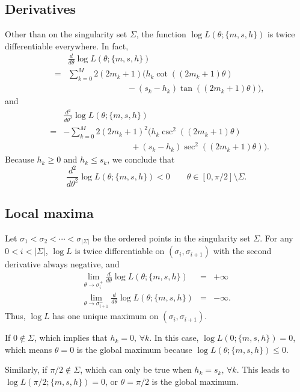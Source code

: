 \documentclass{article}
\begin{document}
\subsection{Derivatives}
Other than on the singularity set $\Sigma$, the function
$\log L(\theta; \{m,s,h\})$ is twice differentiable everywhere.
In fact,
\begin{eqnarray}
  &  & \frac{d}{d\theta}\log L(\theta; \{m, s, h\}) \nonumber \\
 & = &  \sum_{k=0}^M 2(2m_k+1)(h_k\cot((2m_k+1)\theta) \nonumber \\
 &   &  \qquad\qquad\qquad\quad -(s_k-h_k)\tan((2m_k+1)\theta)),
\end{eqnarray}
and
\begin{eqnarray}
  &  & \frac{d^2}{d\theta^2}\log L(\theta; \{m, s, h\}) \nonumber \\
  & = &  -\sum_{k=0}^M 2(2m_k+1)^2(h_k\csc^2((2m_k+1)\theta) \nonumber \\
  &   & \qquad\qquad\qquad\qquad +(s_k-h_k)\sec^2((2m_k+1)\theta)).
\end{eqnarray}
Because $h_k \ge 0$ and $h_k \le s_k$, we conclude that
\begin{equation}
  \frac{d^2}{d\theta^2}\log L(\theta; \{m,s,h\}) < 0 \qquad
  \theta\in[0, \pi/2]\setminus\Sigma.
\end{equation}

\subsection{Local maxima}
Let $\sigma_1 < \sigma_2 < \cdots < \sigma_{|\Sigma|}$ be the ordered
points in the singularity set $\Sigma$.  For any $0 < i < |\Sigma|$,
$\log L$ is twice differentiable on $(\sigma_i, \sigma_{i+1})$ with
the second derivative always negative, and
\begin{eqnarray}
  \lim_{\theta\to\sigma_i^+}\frac{d}{d\theta}\log L(\theta; \{m,s,h\})
  & = & +\infty \\
  \lim_{\theta\to\sigma_{i+1}^-}\frac{d}{d\theta}\log L(\theta; \{m,s,h\})
  & = & -\infty.
\end{eqnarray}
Thus, $\log L$ has one unique maximum on $(\sigma_i, \sigma_{i+1})$.

If $0\notin\Sigma$, which implies that $h_k = 0,\,\forall k$.
In this case, $\log L(0; \{m,s,h\}) = 0$, which means $\theta = 0$ is
the global maximum because $\log L(\theta; \{m,s,h\}) \le 0$.

Similarly, if $\pi/2\notin\Sigma$, which can only be true when
$h_k = s_k,\,\forall k$.  This leads to $\log L(\pi/2; \{m,s,h\}) = 0$,
or $\theta = \pi/2$ is the global maximum.
\end{document}
